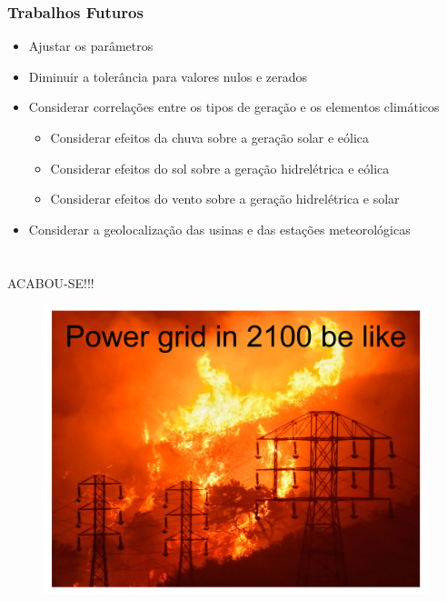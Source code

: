 \documentclass{beamer}
\begin{document}
\begin{frame}[allowframebreaks]
\frametitle{Trabalhos Futuros}
\begin{itemize}
    \item Ajustar os parâmetros
    \item Diminuir a tolerância para valores nulos e zerados
    \item Considerar correlações entre os tipos de geração e os elementos climáticos
    \begin{itemize}
        \item Considerar efeitos da chuva sobre a geração solar e eólica
        \item Considerar efeitos do sol sobre a geração hidrelétrica e eólica
        \item Considerar efeitos do vento sobre a geração hidrelétrica e solar
    \end{itemize}
    \item Considerar a geolocalização das usinas e das estações meteorológicas
\end{itemize}
\end{frame}


\section*{}
\setcounter{section}{0}


\begin{frame}
\begin{center}
    \Huge ACABOU-SE!!!
\end{center}
\begin{figure}
    \centering
    \includegraphics[width=0.7\linewidth]{power-grid-2100-be-like.pdf}
\end{figure}
\end{frame}
\end{document}
